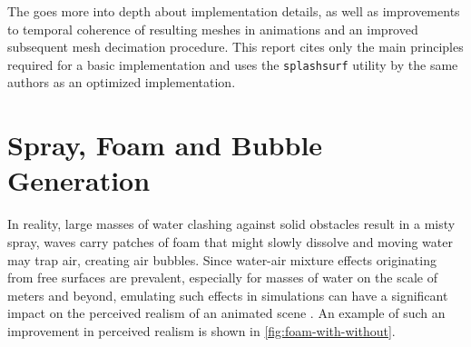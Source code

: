\documentclass[oneside, a4paper]{book}
\begin{document}
  The \autocite[original paper]{laplacian-surf-reconst} goes more into depth about implementation details, as well as improvements to temporal coherence of resulting meshes in animations and an improved subsequent mesh decimation procedure. This report cites only the main principles required for a basic implementation and uses the \texttt{splashsurf} utility by the same authors as an optimized implementation.

  \section{Spray, Foam and Bubble Generation}
  In reality, large masses of water clashing against solid obstacles result in a misty spray, waves carry patches of foam that might slowly dissolve and moving water may trap air, creating air bubbles. Since water-air mixture effects originating from free surfaces are prevalent, especially for masses of water on the scale of meters and beyond, emulating such effects in simulations can have a significant impact on the perceived realism of an animated scene \autocite{spray-foam-bubbles}. An example of such an improvement in perceived realism is shown in \autoref{fig:foam-with-without}.
\end{document}
